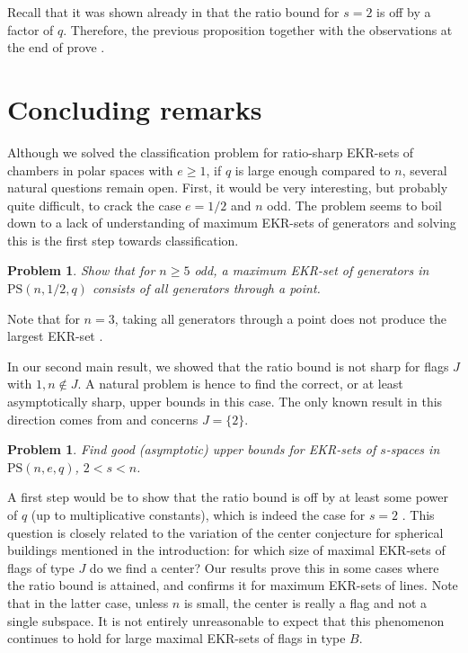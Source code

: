 \documentclass[11pt]{article}
\newtheorem{problem}[thm]{Problem}
\newcommand{\PS}{\mathrm{PS}}
\newcommand{\philipp}[1]{\textcolor{blue}{#1}}
\renewcommand{\geq}{\geqslant}
\newcommand{\SM}[1]{\textcolor{red}{SM: #1}}
\begin{document}
Recall that it was shown already in \cite{metsch_pairwise-non-opp-lines} that the ratio bound for $s=2$ is off by a factor of $q$. Therefore, the previous proposition together with the observations at the end of  prove .\\


\section{Concluding remarks}

Although we solved the classification problem for ratio-sharp EKR-sets of chambers in polar spaces with $e\geq 1$, if $q$ is large enough compared to $n$, several natural questions remain open. First, it would be very interesting, but probably quite difficult, to crack the case $e = 1/2$ and $n$ odd.  
The problem seems to boil down to a lack of understanding of maximum EKR-sets of generators and solving this is the first step towards classification. 


\begin{problem}
    Show that for $n \geq 5$ odd, a maximum EKR-set of generators in $\PS(n,1/2,q)$ consists of all generators through a point.
\end{problem}

Note that for $n = 3$, taking all generators through a point does not produce the largest EKR-set \cite{EKR_polarspace_generators}.


In our second main result, we showed that the ratio bound is not sharp for flags $J$ with $1,n\notin J$. A natural problem is hence to find the correct, or at least asymptotically sharp, upper bounds in this case. The only known result in this direction comes from \cite{metsch_pairwise-non-opp-lines} and concerns $J=\{2\}$. 

\begin{problem}
    Find good (asymptotic) upper bounds for EKR-sets of $s$-spaces in $\PS(n,e,q)$, $2<s<n$.
\end{problem}

A first step would be to show that the ratio bound is off by at least some power of $q$ (up to multiplicative constants), which is indeed the case for $s = 2$ \cite{metsch_pairwise-non-opp-lines}. This question is closely related to the variation of the center conjecture for spherical buildings mentioned in the introduction: for which size of maximal EKR-sets of flags of type $J$ do we find a center? Our results prove this in some cases where the ratio bound is attained, and \cite{metsch_pairwise-non-opp-lines} confirms it for maximum EKR-sets of lines. Note that in the latter case, unless $n$ is small, the center is really a flag and not a single subspace. It is not entirely unreasonable to expect that this phenomenon continues to hold for large maximal EKR-sets of flags in type $B$.
\end{document}
